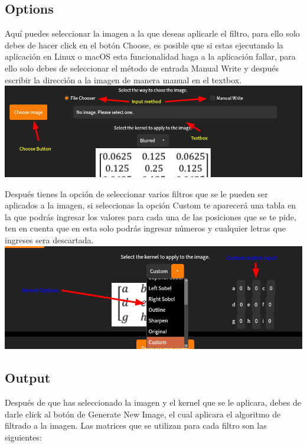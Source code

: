 \documentclass[12pt]{article}
\begin{document}
\subsection{Options}

Aquí puedes seleccionar la imagen a la que deseas aplicarle el filtro, para ello solo debes de hacer click en el
 botón Choose, es posible que si estas ejecutando la aplicación en Linux o macOS esta funcionalidad haga a la
 aplicación fallar, para ello solo debes de seleccionar el método de entrada Manual Write y después escribir la
 dirección a la imagen de manera manual en el textbox. \\

\includegraphics[width=\textwidth]{image_selection}

Después tienes la opción de seleccionar varios filtros que se le pueden ser aplicados a la imagen, si seleccionas
 la opción Custom te aparecerá una tabla en la que podrás ingresar los valores para cada una de las posiciones
 que se te pide, ten en cuenta que en esta solo podrás ingresar números y cualquier letras que ingreses sera
 descartada. \\

\includegraphics[width=\textwidth]{kernel_selection}

\subsection{Output}

Después de que has seleccionado la imagen y el kernel que se le aplicara, debes de darle click al botón de Generate
 New Image, el cual aplicara el algoritmo de filtrado a la imagen. Las matrices que se utilizan para cada filtro
 son las siguientes: \\
\end{document}
